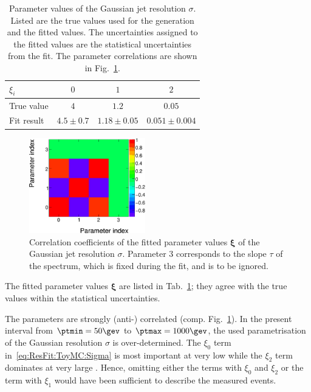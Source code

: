 \begin{table}[ht]
  \caption{Parameter values of the Gaussian jet \pt resolution
    $\sigma$.
    Listed are the true values used for the generation and
    the fitted values.
    The uncertainties assigned to the fitted values
    are the statistical uncertainties from the fit.
    The parameter correlations are shown in Fig.~\ref{fig:ResFit:App:ToyMC:PtGenCuts:ParCorr}.}
  \centering
  \begin{tabular}[ht]{lccc}
    \toprule
    $\xi_{i}$ & $0$ & $1$ & $2$ \\
    \midrule
    True value & $4$           & $1.2$           & $0.05$ \\
    Fit result & $4.5 \pm 0.7$ & $1.18 \pm 0.05$ & $0.051 \pm 0.004$ \\
    \bottomrule
  \end{tabular}
  \label{tab:ResFit:ToyMC:PtGenCuts:FitResult}
\end{table}


\begin{figure}[ht]
  \centering
  \includegraphics[width=0.45\textwidth]{figures/resFit_ToyMC_PtGenCuts_Correlations}
  \caption{Correlation coefficients of the fitted parameter values
    $\mathbf{\xi}$ of the Gaussian jet \pt resolution $\sigma$. 
    Parameter $3$ corresponds to the slope $\tau$ of the
    spectrum, which is fixed during the fit, and is to be ignored.}
  \label{fig:ResFit:App:ToyMC:PtGenCuts:ParCorr}
\end{figure}

The fitted parameter values $\mathbf{\xi}$ are listed in Tab.~\ref{tab:ResFit:ToyMC:PtGenCuts:FitResult};
they agree with the true values within the statistical uncertainties.

The parameters are strongly (anti-) correlated (comp. Fig.~\ref{fig:ResFit:App:ToyMC:PtGenCuts:ParCorr}).
In the present \pttrue interval from \mbox{$\ptmin = 50\gev$} to \mbox{$\ptmax = 1000\gev$}, the used parametrisation of the Gaussian resolution $\sigma$ is over-determined.
The $\xi_{0}$ term in~\eqref{eq:ResFit:ToyMC:Sigma} is most important at very low \pt while the $\xi_{2}$ term dominates at very large \pt.
Hence, omitting either the terms with $\xi_{0}$ and $\xi_{2}$ or the
term with $\xi_{1}$ would have been sufficient to describe the measured events.

